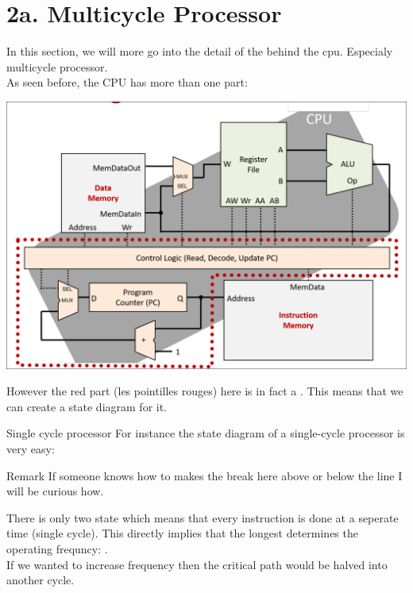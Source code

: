 \section{2a. Multicycle Processor}
In this section, we will more go into the detail of the  behind the cpu. Especialy multicycle processor.\\
As seen before, the CPU has more than one part:
\begin{center}
\includegraphics[scale=0.2]{screenshots/2025-10-21_5.png}
\end{center}
However the red part (les pointilles rouges) here is in fact a . This means that we can create a state diagram for it.
\begin{parag}{Single cycle processor} For instance the state diagram of a single-cycle processor is very easy: 
\begin{center}
\end{center}
\begin{subparag}{Remark}
    If someone knows how to makes the break here above or below the line I will be curious how.
\end{subparag}
There is only two state which means that every instruction is done at a seperate time (single cycle). This directly implies that the longest  determines the operating frequncy: .\\
If we wanted to increase frequency then the critical path would be halved into another cycle.
\end{parag}
